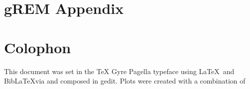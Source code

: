 
\appendix
\chapter{gREM Appendix}
\label{appendixlabel1}




\chapter{Colophon}
\label{appendixlabel3}

This document was set in the TeX Gyre Pagella typeface using \LaTeX\ and Bib\LaTeX via \XeLaTeX and composed in gedit.
Plots were created with a combination of \cite{ggplot2, palettetown, ggtree}


